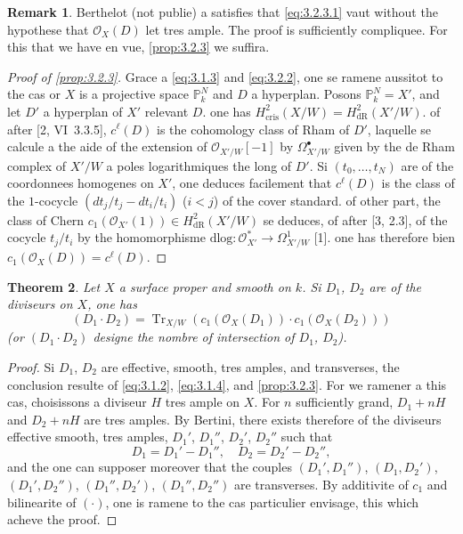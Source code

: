 \documentclass[12pt,a4paper]{article}
\theoremstyle{plain}
\newtheorem{theorem}{Theorem}[section]
\theoremstyle{definition}
\newtheorem{remark}[theorem]{Remark}
\theoremstyle{remark}
\DeclareMathOperator{\Tr}{Tr}
\newcommand{\dlog}{\mathrm{dlog}}
\newcommand{\cris}{\mathrm{cris}}
\begin{document}
\begin{remark}\label{rem:3.2.4}
Berthelot (not publie) a satisfies that \eqref{eq:3.2.3.1} vaut without the hypothese that $\mathcal{O}_X(D)$ let tres ample. The proof is sufficiently compliquee. For this that we have en vue, \ref{prop:3.2.3} we suffira.
\end{remark}

\begin{proof}[Proof of \ref{prop:3.2.3}]
Grace a \eqref{eq:3.1.3} and \eqref{eq:3.2.2}, one se ramene aussitot to the cas or $X$ is a projective space $\mathbb{P}^N_k$ and $D$ a hyperplan. Posons $\mathbb{P}^N_k = X'$, and let $D'$ a hyperplan of $X'$ relevant $D$. one has $H^2_{\cris}(X/W) = H^2_{\mathrm{dR}}(X'/W)$. of after [2, VI~3.3.5], $c^{\ell}(D)$ is the cohomology class of Rham of $D'$, laquelle se calcule a the aide of the extension of $\mathcal{O}_{X'/W}[-1]$ by $\Omega^{\bullet}_{X'/W}$ given by the de Rham complex of $X'/W$ a poles logarithmiques the long of $D'$. Si $(t_0, \ldots, t_N)$ are of the coordonnees homogenes on $X'$, one deduces facilement that $c^{\ell}(D)$ is the class of the $1$-cocycle $(dt_j/t_j - dt_i/t_i)$ ($i < j$) of the cover standard. of other part, the class of Chern $c_1(\mathcal{O}_{X'}(1)) \in H^2_{\mathrm{dR}}(X'/W)$ se deduces, of after [3, 2.3], of the cocycle $t_j/t_i$ by the homomorphisme $\dlog: \mathcal{O}_{X'}^* \to \Omega^1_{X'/W}$ [1]. one has therefore bien $c_1(\mathcal{O}_X(D)) = c^{\ell}(D)$.
\end{proof}

\begin{theorem}\label{thm:3.3}
Let $X$ a surface proper and smooth on $k$. Si $D_1$, $D_2$ are of the diviseurs on $X$, one has
\[
(D_1 \cdot D_2) = \Tr_{X/W}(c_1(\mathcal{O}_X(D_1)) \cdot c_1(\mathcal{O}_X(D_2)))
\]
(or $(D_1 \cdot D_2)$ designe the nombre of intersection of $D_1$, $D_2$).
\end{theorem}

\begin{proof}
Si $D_1$, $D_2$ are effective, smooth, tres amples, and transverses, the conclusion resulte of \eqref{eq:3.1.2}, \eqref{eq:3.1.4}, and \ref{prop:3.2.3}. For we ramener a this cas, choisissons a diviseur $H$ tres ample on $X$. For $n$ sufficiently grand, $D_1 + nH$ and $D_2 + nH$ are tres amples. By Bertini, there exists therefore of the diviseurs effective smooth, tres amples, $D_1'$, $D_1''$, $D_2'$, $D_2''$ such that
\[
D_1 = D_1' - D_1'', \quad D_2 = D_2' - D_2'',
\]
and the one can supposer moreover that the couples $(D_1', D_1'')$, $(D_1, D_2')$, $(D_1', D_2'')$, $(D_1'', D_2')$, $(D_1'', D_2'')$ are transverses. By additivite of $c_1$ and bilinearite of $(\cdot)$, one is ramene to the cas particulier envisage, this which acheve the proof.
\end{proof}
\end{document}

